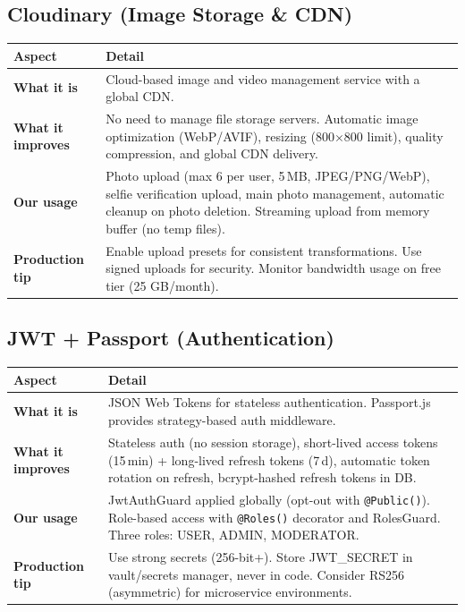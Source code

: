 \documentclass[a4paper,11pt]{article}
\begin{document}
\subsection{Cloudinary (Image Storage \& CDN)}

\begin{longtable}{L{3.5cm} L{11.5cm}}
\toprule
\textbf{Aspect} & \textbf{Detail} \\
\midrule
\endhead
\textbf{What it is} & Cloud-based image and video management service with a global CDN. \\
\midrule
\textbf{What it improves} & No need to manage file storage servers. Automatic image optimization (WebP/AVIF), resizing (800$\times$800 limit), quality compression, and global CDN delivery. \\
\midrule
\textbf{Our usage} & Photo upload (max 6 per user, 5\,MB, JPEG/PNG/WebP), selfie verification upload, main photo management, automatic cleanup on photo deletion. Streaming upload from memory buffer (no temp files). \\
\midrule
\textbf{Production tip} & Enable upload presets for consistent transformations. Use signed uploads for security. Monitor bandwidth usage on free tier (25 GB/month). \\
\bottomrule
\end{longtable}

\subsection{JWT + Passport (Authentication)}

\begin{longtable}{L{3.5cm} L{11.5cm}}
\toprule
\textbf{Aspect} & \textbf{Detail} \\
\midrule
\endhead
\textbf{What it is} & JSON Web Tokens for stateless authentication. Passport.js provides strategy-based auth middleware. \\
\midrule
\textbf{What it improves} & Stateless auth (no session storage), short-lived access tokens (15\,min) + long-lived refresh tokens (7\,d), automatic token rotation on refresh, bcrypt-hashed refresh tokens in DB. \\
\midrule
\textbf{Our usage} & JwtAuthGuard applied globally (opt-out with \texttt{@Public()}). Role-based access with \texttt{@Roles()} decorator and RolesGuard. Three roles: USER, ADMIN, MODERATOR. \\
\midrule
\textbf{Production tip} & Use strong secrets (256-bit+). Store JWT\_SECRET in vault/secrets manager, never in code. Consider RS256 (asymmetric) for microservice environments. \\
\bottomrule
\end{longtable}
\end{document}
